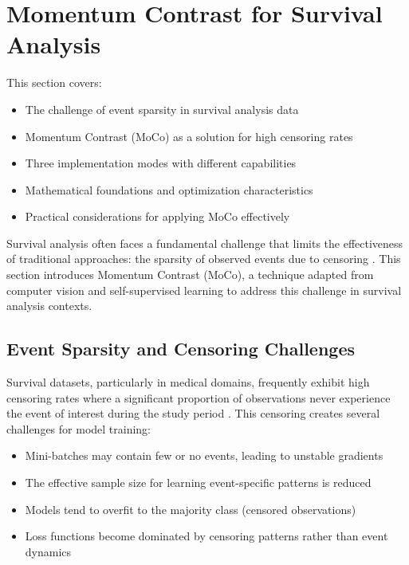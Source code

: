 \section{Momentum Contrast for Survival Analysis}

\begin{notebox}[title=Section Overview]
  This section covers:
  \begin{itemize}
  \item The challenge of event sparsity in survival analysis data
  \item Momentum Contrast (MoCo) as a solution for high censoring rates
  \item Three implementation modes with different capabilities
  \item Mathematical foundations and optimization characteristics
  \item Practical considerations for applying MoCo effectively
  \end{itemize}
\end{notebox}

Survival analysis often faces a fundamental challenge that limits the effectiveness of traditional approaches: the sparsity of observed events due to censoring \parencite{kaplan1958}. This section introduces Momentum Contrast (MoCo), a technique adapted from computer vision and self-supervised learning \parencite{he2020momentum} to address this challenge in survival analysis contexts.

\subsection{Event Sparsity and Censoring Challenges}

Survival datasets, particularly in medical domains, frequently exhibit high censoring rates where a significant proportion of observations never experience the event of interest during the study period \parencite{ibrahim2001}. This censoring creates several challenges for model training:

\begin{itemize}
\item Mini-batches may contain few or no events, leading to unstable gradients
\item The effective sample size for learning event-specific patterns is reduced
\item Models tend to overfit to the majority class (censored observations)
\item Loss functions become dominated by censoring patterns rather than event dynamics
\end{itemize}

